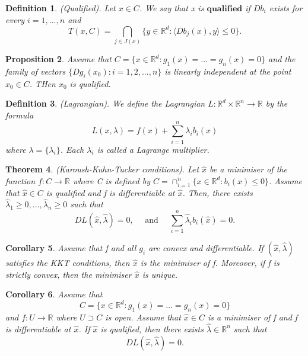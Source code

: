 \documentclass[twoside]{article}
\newcounter{lecnum}
\newtheorem{theorem}{Theorem}[lecnum]
\newtheorem{proposition}[theorem]{Proposition}
\newtheorem{corollary}[theorem]{Corollary}
\newtheorem{definition}[theorem]{Definition}
\begin{document}
\begin{definition}(Qualified). Let $x \in C$. We say that x is $\textbf{qualified}$ if $Db_i$ exists for every $i = 1,...,n$ and 
$$
T(x,C) = \bigcap_{j \in J(x)}\{y \in \mathbb{R}^d: \langle Db_j(x), y \rangle \leq 0\}.
$$
\end{definition}

\begin{proposition}Assume that $C = \{x \in \mathbb{R}^d: g_1(x) = ... = g_n(x) = 0\}$ and the family of vectors $\{Dg_i(x_0): i=1,2,...,n\}$ is linearly independent at the point $x_0 \in C$. THen $x_0$ is qualified.
\end{proposition}

\begin{definition}(Lagrangian). We define the Lagrangian $L: \mathbb{R}^d \times \mathbb{R}^n \rightarrow \mathbb{R}$ by the formula 
$$
L(x, \lambda) = f(x) + \sum_{i=1}^n\lambda_ib_i(x)
$$
where $\lambda = \{\lambda_i\}$. Each $\lambda_i$ is called a Lagrange multiplier.
\end{definition}

\begin{theorem}(Karoush-Kuhn-Tucker conditions). Let $\hat{x}$ be a minimiser of the function $f:C \rightarrow \mathbb{R}$ where C is defined by $C = \cap_{i=1}^n\{x \in \mathbb{R}^d: b_i(x) \leq 0\}$. Assume that $\hat{x} \in C$ is qualified and f is differentiable at $\hat{x}$. Then, there exists $\hat{\lambda}_1 \geq 0, ..., \hat{\lambda}_n \geq 0$ such that 
$$
DL(\hat{x}, \hat{\lambda}) = 0, \quad \text{ and } \quad \sum_{i=1}^n\hat{\lambda}_ib_i(\hat{x}) = 0.
$$
\end{theorem}

\begin{corollary}Assume that f and all $g_i$ are convex and differentiable. If $(\hat{x}, \hat{\lambda})$ satisfies the KKT conditions, then $\hat{x}$ is the minimiser of f. Moreover, if f is strictly convex, then the minimiser $\hat{x}$ is unique.
\end{corollary}

\begin{corollary}Assume that 
$$
C = \{x \in \mathbb{R}^d: g_1(x) = ... = g_n(x) = 0\}
$$
and $f: U \rightarrow \mathbb{R}$ where $U \supset C$ is open. Assume that $\hat{x} \in C$ is a minimiser of f and f is differentiable at $\hat{x}$. If $\hat{x}$ is qualified, then there exists $\hat{\lambda} \in \mathbb{R}^n$ such that
$$
DL(\hat{x}, \hat{\lambda}) = 0.
$$
\end{corollary}
\end{document}

